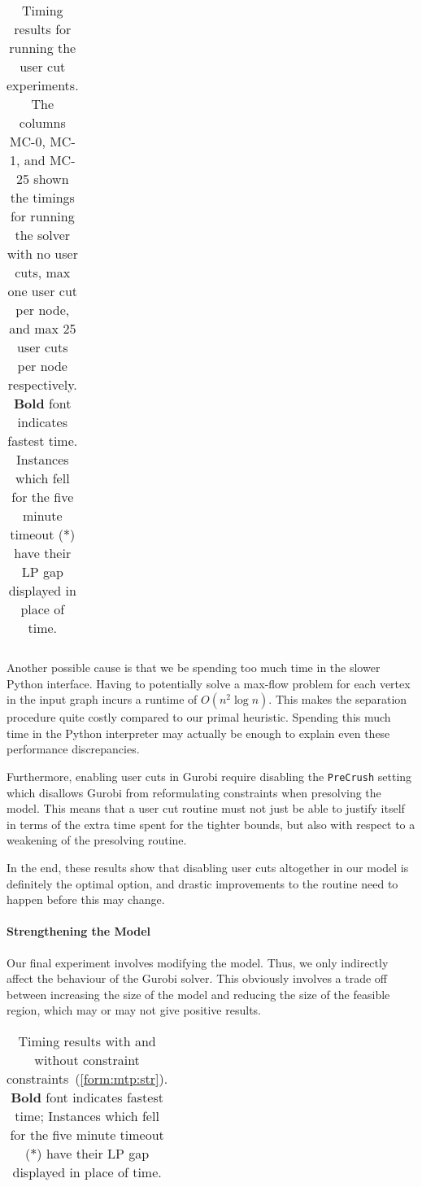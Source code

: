\begin{table}[h!]
  \centering
  \begin{tabular}[h!]{|c|c|c|c|c|}\hline
    
  \end{tabular}
  \caption{Timing results for running the user cut experiments. The columns MC-0,
    MC-1, and MC-25 shown the timings for running the solver with no user cuts, max
    one user cut per node, and max 25 user cuts per node respectively.
    \textbf{Bold} font indicates fastest time. Instances which fell for the five minute
  timeout ($*$) have their LP gap displayed in place of time.}\label{tab:jmp:maxcut}
\end{table}

Another possible cause is that we be spending too much time in the slower Python
interface. Having to potentially
solve a max-flow problem for each vertex in the input graph incurs a runtime
of $O(n^2 \log n)$. This makes the separation procedure quite costly compared
to our primal heuristic.
Spending this much time in the Python interpreter may actually be enough to explain
even these performance
discrepancies.

Furthermore, enabling user cuts in Gurobi require disabling the \texttt{PreCrush} setting
which disallows Gurobi from reformulating constraints when presolving the model. This means
that a user cut routine must not just be able to justify
itself in terms of the extra time spent for the tighter bounds,
but also with respect to a weakening of the presolving routine.

In the end, these results show that disabling user cuts altogether in our model is definitely
the optimal option, and drastic improvements to the routine need to happen before this may
change.

\paragraph{Strengthening the Model}
Our final experiment involves modifying the model. Thus, we only indirectly affect the
behaviour of the Gurobi solver.
This obviously involves a trade off between increasing the size of the model and reducing the size
of the feasible region, which may or may not give positive results.

\begin{table}[h!]
  \centering
  \begin{tabular}[h!]{|c|c|c|c|}\hline
    
  \end{tabular}
  \caption{Timing results with and without constraint constraints~(\ref{form:mtp:str}).
    \textbf{Bold} font indicates fastest time; Instances which fell for the five minute
  timeout ($*$) have their LP gap displayed in place of time.} 
  \label{tab:jmp:strengthen}
\end{table}

